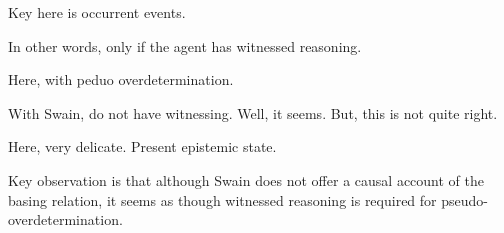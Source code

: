 \begin{note}
  Key here is occurrent events.

  In other words, only if the agent has witnessed reasoning.
\end{note}

\begin{note}[Swain]
  Here, with peduo overdetermination.

  With Swain, do not have witnessing.
  Well, it seems.
  But, this is not quite right.

  Here, very delicate.
  Present epistemic state.

  Key observation is that although Swain does not offer a causal account of the basing relation, it seems as though witnessed reasoning is required for pseudo-overdetermination.
\end{note}

\paragraph*{\citeauthor{Tolliver:1982us}}

